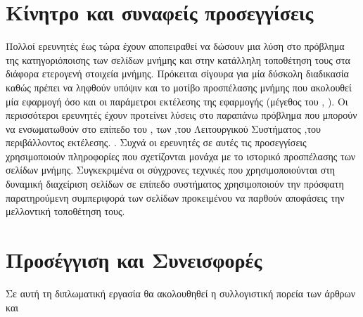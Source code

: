 \section{Κίνητρο και συναφείς προσεγγίσεις}
Πολλοί ερευνητές έως τώρα έχουν αποπειραθεί να δώσουν μια λύση στο πρόβλημα της κατηγοριόποισης των σελίδων μνήμης και στην κατάλληλη τοποθέτηση τους στα διάφορα ετερογενή στοιχεία μνήμης. Πρόκειται σίγουρα για μία δύσκολη διαδικασία καθώς πρέπει να ληφθούν υπόψιν και το μοτίβο προσπέλασης μνήμης που ακολουθεί μία εφαρμογή όσο και οι παράμετροι εκτέλεσης της εφαρμογής (μέγεθος του , ). Οι περισσότεροι ερευνητές έχουν προτείνει λύσεις στο παραπάνω πρόβλημα που μπορούν να ενσωματωθούν στο επίπεδο του  , των  ,του Λειτουργικού Συστήματος ,του περιβάλλοντος εκτέλεσης. \cite{Chou2017BATMANTF,10.1145/2901318.2901344,10.1145/2926697.2926702,10.1145/3132402.3132418,10.1145/3241624.2926702,10.5555/3291656.3291698,DBLP:journals/corr/WuHL17}. Συχνά οι ερευνητές σε αυτές τις προσεγγίσεις χρησιμοποιούν πληροφορίες που σχετίζονται μονάχα με το ιστορικό προσπέλασης των σελίδων μνήμης. Συγκεκριμένα οι σύγχρονες τεχνικές που χρησιμοποιούνται στη δυναμική διαχείριση σελίδων σε επίπεδο συστήματος χρησιμοποιούν την πρόσφατη παρατηρούμενη συμπεριφορά των σελίδων προκειμένου να παρθούν αποφάσεις την μελλοντική τοποθέτηση τους.

\section{Προσέγγιση και Συνεισφορές}
Σε αυτή τη διπλωματική εργασία θα ακολουθηθεί η συλλογιστική πορεία των άρθρων \emph{} \cite{hashemi2018learning} και \emph{} \cite{10.1145/3307681.3325398}
\\

